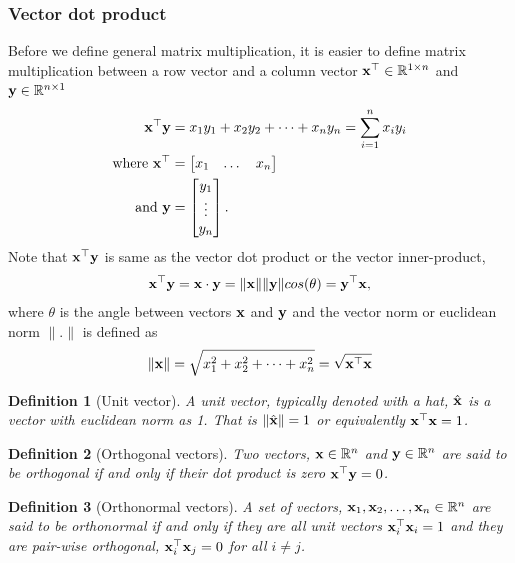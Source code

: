 \documentclass[twocolumn]{article}
\newtheorem{defn}{Definition}
\begin{document}
\subsubsection{Vector dot product}
Before we define  general matrix multiplication, it  is easier to define matrix
multiplication   between a row vector and a column vector $\mathbf{x}^\top  \in
\mathbb{R}^{1 \times  n}$ and $\mathbf{y}\in\mathbb{R}^{n \times 1}$
%
\begin{align}
  \mathbf{x}^\top \mathbf{y}  &= x_1y_1 + x_2 y_2 + \dots  + x_n y_n = \sum_{i=1}^n  x_iy_i
\\
\text{where }  \mathbf{x}^\top &=  \begin{bmatrix} x_1 &  \dots  &  x_n \end{bmatrix}
\notag \\
  \text{  and  }\mathbf{y} &=  \begin{bmatrix} y_1 \\  \vdots  \\  y_n \end{bmatrix}.
  \notag
\end{align}
%
Note that $\mathbf{x}^\top \mathbf{y}$   is same as the vector  dot product  or the vector
inner-product,
%
\begin{align}
  \mathbf{x}^\top \mathbf{y} = \mathbf{x} \cdot \mathbf{y}  =  \|\mathbf{x}\|\|\mathbf{y}\|cos(\theta) = \mathbf{y}^\top \mathbf{x},
\end{align}
where  $\theta$  is the angle between   vectors $\mathbf{x}$ and $\mathbf{y}$ and  the
vector norm  or euclidean norm $\|.\|$ is defined as
%
\begin{align}
  \|\mathbf{x}\| =  \sqrt{x_1^2 + x_2^2  +   \dots +  x_n^2} = \sqrt{\mathbf{x}^\top\mathbf{x}}
\end{align}
%

\begin{defn}[Unit  vector]
  A unit vector, typically denoted  with a hat, $\hat{\mathbf{x}}$ is a vector with
  euclidean norm as 1. That is  $\|\hat{\mathbf{x}}\| = 1$ or equivalently
  $\mathbf{x}^\top\mathbf{x} =  1$.
\end{defn}

\begin{defn}[Orthogonal vectors]
  Two vectors, $\mathbf{x} \in  \mathbb{R}^n$  and $\mathbf{y} \in \mathbb{R}^n$ are said to be
  orthogonal if and only if their dot product is zero $\mathbf{x}^\top \mathbf{y} =  0$.
\end{defn}

\begin{defn}[Orthonormal vectors]
  A set of vectors, $\mathbf{x}_1, \mathbf{x}_2, \dots, \mathbf{x}_n \in  \mathbb{R}^n$  are said to be
  orthonormal if and only if they are all  unit vectors $\mathbf{x}_i^\top\mathbf{x}_i  = 1$
  and they are  pair-wise orthogonal, $\mathbf{x}_i^\top  \mathbf{x}_j =  0$ for all $i \ne j$. 
\end{defn}
\end{document}
